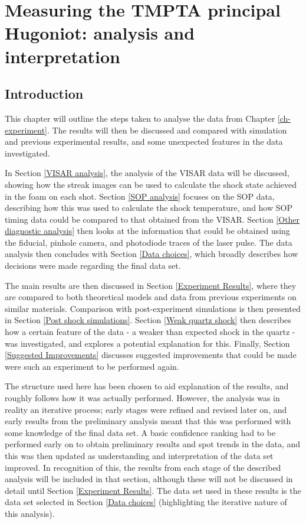 \chapter{\label{ch-experimentAnalysis} Measuring the TMPTA principal Hugoniot: analysis and interpretation}

\minitoc

\section{Introduction}

This chapter will outline the steps taken to analyse the data from Chapter \ref{ch-experiment}. The results will then be discussed and compared with simulation and previous experimental results, and some unexpected features in the data investigated. 

In Section \ref{VISAR analysis}, the analysis of the VISAR data will be discussed, showing how the streak images can be used to calculate the shock state achieved in the foam on each shot. Section \ref{SOP analysis} focuses on the SOP data, describing how this was used to calculate the shock temperature, and how SOP timing data could be compared to that obtained from the VISAR. Section \ref{Other diagnostic analysis} then looks at the information that could be obtained using the fiducial, pinhole camera, and photodiode traces of the laser pulse. The data analysis then concludes with Section \ref{Data choices}, which broadly describes how decisions were made regarding the final data set.

The main results are then discussed in Section \ref{Experiment Results}, where they are compared to both theoretical models and data from previous experiments on similar materials. Comparison with post-experiment simulations is then presented in Section \ref{Post shock simulations}. Section \ref{Weak quartz shock} then describes how a certain feature of the data - a weaker than expected shock in the quartz - was investigated, and explores a potential explanation for this. Finally, Section \ref{Suggested Improvements} discusses suggested improvements that could be made were such an experiment to be performed again.

The structure used here has been chosen to aid explanation of the results, and roughly follows how it was actually performed. However, the analysis was in reality an iterative process; early stages were refined and revised later on, and early results from the preliminary analysis meant that this was performed with some knowledge of the final data set. A basic confidence ranking had to be performed early on to obtain preliminary results and spot trends in the data, and this was then updated as understanding and interpretation of the data set improved. In recognition of this, the results from each stage of the described analysis will be included in that section, although these will not be discussed in detail until Section \ref{Experiment Results}. The data set used in these results is the data set selected in Section \ref{Data choices} (highlighting the iterative nature of this analysis).

